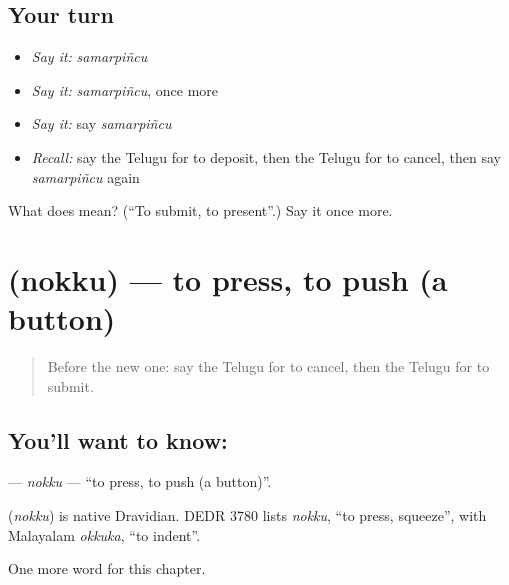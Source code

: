 \subsection*{Your turn}
\begin{itemize}
\raggedright
  \item \emph{Say it:} \emph{samarpiñcu}
  \item \emph{Say it:} \emph{samarpiñcu}, once more
  \item \emph{Say it:} say \emph{samarpiñcu}
  \item \emph{Recall:} say the Telugu for to deposit, then the Telugu for to cancel, then say \emph{samarpiñcu} again
\end{itemize}

\begin{tcolorbox}[breakable,colback=teal!4,colframe=teal!35!black,title={Before you move on}]
What does  mean? (\textquotedblleft{}To submit, to present\textquotedblright{}.) Say it once more.
\end{tcolorbox}
\section[\texorpdfstring{\te{నొక్కు} (nokku)}{నొక్కు (nokku)}]{ (nokku) — to press, to push (a button)}

\label{lesson:TE-C281-nokku}



\begin{quote}
Before the new one: say the Telugu for to cancel, then the Telugu for to submit.
\end{quote}

\subsection*{You'll want to know: }
\textbf{} — \emph{nokku} — \textquotedblleft{}to press, to push (a button)\textquotedblright{}.

\begin{cousinweb}
\textbf{} (\emph{nokku}) is native Dravidian. DEDR 3780 lists \emph{nokku}, \textquotedblleft{}to press, squeeze\textquotedblright{}, with Malayalam \emph{okkuka}, \textquotedblleft{}to indent\textquotedblright{}.
\end{cousinweb}

\begin{grammarlens}[title={What you've built}]
One more word for this chapter.
\end{grammarlens}

